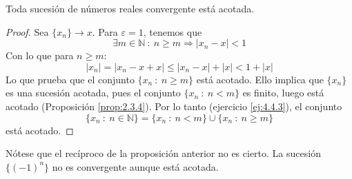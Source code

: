 \begin{prop}
    Toda sucesión de números reales convergente está acotada.
\end{prop}
\begin{proof}
    Sea $\{x_n\}\longrightarrow x$. Para $\varepsilon = 1$, tenemos que
    \begin{equation*}
        \exists m \in \mathbb{N}~:~ n \geq m \Longrightarrow  \left| x_n - x \right| < 1
    \end{equation*}
    Con lo que para $n \geq m$:
    \begin{equation*}
        \left| x_n \right| = \left| x_n - x + x\right| \leq \left| x_n - x \right| + \left| x \right| < 1+ \left| x \right|
    \end{equation*}
    Lo que prueba que el conjunto $\{x_n ~:~ n \geq m \}$ está acotado. Ello implica que $\{x_n\}$ es una sucesión acotada,
    pues el conjunto $\{x_n ~:~ n < m \}$ es finito, luego está acotado (Proposición \ref{prop:2.3.4}). Por lo tanto (ejercicio \ref{ej:4.4.3}), el conjunto
    \begin{equation*}
        \{x_n ~:~ n \in \mathbb{N} \} = \{x_n ~:~ n < m \} \cup \{x_n ~:~ n \geq m \}
    \end{equation*}
    está acotado.
\end{proof}

Nótese que el recíproco de la proposición anterior no es cierto. La sucesión $\{(-1)^n\}$ no es convergente aunque está acotada.


